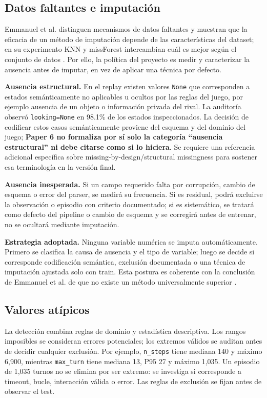 \subsection{Datos faltantes e imputación}
\label{subsec:imputacion}
Emmanuel et al. distinguen mecanismos de datos faltantes y muestran que
la eficacia de un método de imputación depende de las características
del dataset; en su experimento KNN y missForest intercambian cuál es
mejor según el conjunto de datos \cite{emmanuel_missing_2021}. Por ello,
la política del proyecto es medir y caracterizar la ausencia antes de
imputar, en vez de aplicar una técnica por defecto.

\noindent\textbf{Ausencia estructural.} En el replay existen valores
\texttt{None} que corresponden a estados semánticamente no aplicables u
ocultos por las reglas del juego, por ejemplo ausencia de un objeto o
información privada del rival. La auditoría observó \texttt{looking=None}
en 98.1\% de los estados inspeccionados. La decisión de codificar estos
casos semánticamente proviene del esquema y del dominio del juego;
\textbf{Paper 6 no formaliza por sí solo la categoría ``ausencia
estructural'' ni debe citarse como si lo hiciera}. Se requiere una
referencia adicional específica sobre missing-by-design/structural
missingness para sostener esa terminología en la versión final.

\noindent\textbf{Ausencia inesperada.} Si un campo requerido falta por
corrupción, cambio de esquema o error del parser, se medirá su
frecuencia. Si es residual, podrá excluirse la observación o episodio
con criterio documentado; si es sistemático, se tratará como defecto
del pipeline o cambio de esquema y se corregirá antes de entrenar, no
se ocultará mediante imputación.

\noindent\textbf{Estrategia adoptada.} Ninguna variable numérica se
imputa automáticamente. Primero se clasifica la causa de ausencia y el
tipo de variable; luego se decide si corresponde codificación
semántica, exclusión documentada o una técnica de imputación ajustada
solo con train. Esta postura es coherente con la conclusión de Emmanuel
et al. de que no existe un método universalmente superior
\cite{emmanuel_missing_2021}.

\subsection{Valores atípicos}
\label{subsec:atipicos}
La detección combina reglas de dominio y estadística descriptiva. Los
rangos imposibles se consideran errores potenciales; los extremos
válidos se auditan antes de decidir cualquier exclusión. Por ejemplo,
\texttt{n\_steps} tiene mediana 140 y máximo 6,900, mientras
\texttt{max\_turn} tiene mediana 13, P95 27 y máximo 1,035. Un episodio
de 1,035 turnos no se elimina por ser extremo: se investiga si
corresponde a timeout, bucle, interacción válida o error. Las reglas de
exclusión se fijan antes de observar el test.

